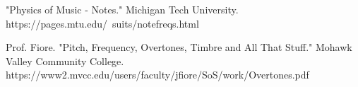 \documentclass[a4paper,10 pt]{article}
\begin{document}
\begin{thebibliography}{9}
 "Physics of Music - Notes." Michigan Tech University. https://pages.mtu.edu/~suits/notefreqs.html

 Prof. Fiore. "Pitch, Frequency, Overtones, Timbre and All That Stuff." Mohawk Valley Community College. https://www2.mvcc.edu/users/faculty/jfiore/SoS/work/Overtones.pdf

\end{thebibliography}
\end{document}
